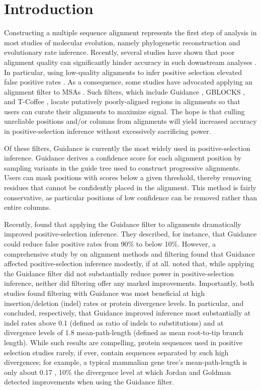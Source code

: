 \documentclass[10pt]{article}
\begin{document}
\section*{Introduction}
Constructing a multiple sequence alignment represents the first step of analysis in most studies of molecular evolution, namely phylogenetic reconstruction and evolutionary rate inference. Recently, several studies have shown that poor alignment quality can significantly hinder accuracy in such downstream analyses \citep{Ogden2006, Talavera2007, Dwivedi2009, MarkovaRaina2011, Jordan2012}. In particular, using low-quality alignments to infer positive selection elevated false positive rates \citep{Schneider2009, Fletcher2010, MarkovaRaina2011}. As a consequence, some studies have advocated applying an alignment filter to MSAs \citep{Jordan2012, Privman2012}. Such filters, which include Guidance \citep{Penn2010, Privman2012}, GBLOCKS \citep{Castresana2000}, and T-Coffee \citep{Notredame2000}, locate putatively poorly-aligned regions in alignments so that users can curate their alignments to maximize signal. The hope is that culling unreliable positions and/or columns from alignments will yield increased accuracy in positive-selection inference without excessively sacrificing power.

Of these filters, Guidance \citep{Penn2010} is currently the most widely used in positive-selection inference. Guidance derives a confidence score for each alignment position by sampling variants in the guide tree used to construct progressive alignments. Users can mask positions with scores below a given threshold, thereby removing residues that cannot be confidently placed in the alignment. This method is fairly conservative, as particular positions of low confidence can be removed rather than entire columns. 

Recently, \citet{Privman2012} found that applying the Guidance filter to alignments dramatically improved positive-selection inference. They described, for instance, that Guidance could reduce false positive rates from 90\% to below 10\%. However, a comprehensive study by \citet{Jordan2012} on alignment methods and filtering found that Guidance affected positive-selection inference modestly, if at all. \citet{Jordan2012} noted that, while applying the Guidance filter did not substantially reduce power in positive-selection inference, neither did filtering offer any marked improvements. Importantly, both studies found filtering with Guidance was most beneficial at high insertion/deletion (indel) rates or protein divergence levels. In particular, \citet{Privman2012} and \citet{Jordan2012} concluded, respectively, that Guidance improved inference most substantially at indel rates above 0.1 (defined as ratio of indels to substitutions) and at divergence levels of 1.8 mean-path-length (defined as mean root-to-tip branch length). While such results are compelling, protein sequences used in positive selection studies rarely, if ever, contain sequences separated by such high divergences; for example, a typical mammalian gene tree's mean-path-length is only about 0.17 \citep{Spielman2013}, 10\% the divergence level at which Jordan and Goldman detected improvements when using the Guidance filter.
\end{document}
